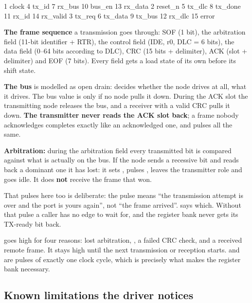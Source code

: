 \begin{textdrawing}
 1 clock     4 tx_id    7 rx_bus    10 bus_en   13 rx_data
 2 reset_n   5 tx_dlc   8 tx_done   11 rx_id    14 rx_valid
 3 tx_req    6 tx_data  9 tx_bus    12 rx_dlc   15 error
\end{textdrawing}

\textbf{The frame sequence} a transmission goes through: SOF (1 bit), the arbitration field (11-bit
identifier + RTR), the control field (IDE, r0, DLC = 6 bits), the data field (0--64 bits according to
DLC), CRC (15 bits + delimiter), ACK (slot + delimiter) and EOF (7 bits). Every field gets a load
state of its own before its shift state.

\textbf{The bus} is modelled as open drain:  decides whether the node drives at all,
 what it drives. The bus value is  only if no node pulls it down. During the
ACK slot the transmitting node releases the bus, and a receiver with a valid CRC pulls it down.
\textbf{The transmitter never reads the ACK slot back}; a frame nobody acknowledges completes exactly
like an acknowledged one, and  pulses all the same.

\textbf{Arbitration:} during the arbitration field every transmitted bit is compared against what is
actually on the bus. If the node sends a recessive bit and reads back a dominant one it has lost: it
sets , pulses , leaves the transmitter role and goes idle. It does
\textbf{not} receive the frame that won.

That  pulses here too is deliberate: the pulse means ``the transmission attempt is over
and the port is yours again'', not ``the frame arrived''.  says which. Without that pulse
a caller has no edge to wait for, and the register bank never gets its TX-ready bit back.

\textbf{} goes high for four reasons: lost arbitration, , a failed CRC
check, and a received remote frame. It stays high until the next transmission or reception starts.
\textbf{} and \textbf{} are pulses of exactly one clock cycle, which is
precisely what makes the register bank necessary.

\subsection{Known limitations the driver notices}
\label{app:project:limits}

